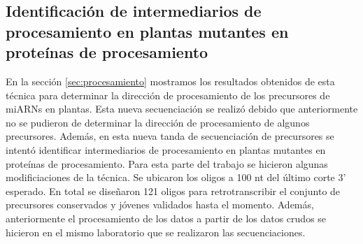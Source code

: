 \subsection{Identificación de intermediarios de procesamiento en plantas mutantes en proteínas de procesamiento}




En la sección \ref{sec:procesamiento} mostramos los resultados obtenidos de esta técnica para determinar la dirección de procesamiento de los precursores de miARNs en plantas.
Esta nueva secuenciación se realizó debido que anteriormente no se pudieron de determinar la dirección de procesamiento de algunos precursores.
Además, en esta nueva tanda de secuenciación de precursores se intentó identificar intermediarios de procesamiento en plantas mutantes en proteínas de procesamiento.  
Para esta parte del trabajo se hicieron algunas modificiaciones de la técnica.
Se ubicaron los oligos a 100 nt del último corte 3' esperado.
En total se diseñaron 121 oligos para retrotranscribir el conjunto de precursores conservados y jóvenes validados hasta el momento.  
Además, anteriormente el procesamiento de los datos a partir de los datos crudos se hicieron en el mismo laboratorio que se realizaron las secuenciaciones.

